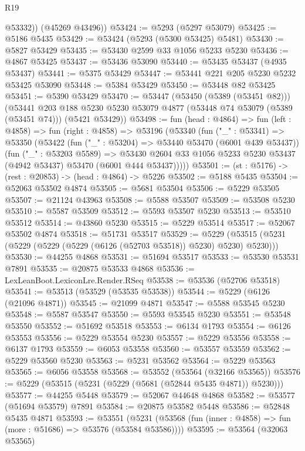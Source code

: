 \begin{lexlean}{R19}
\begin{coremodule}
          @53332))
      (@45269 @43496))
@53424 := @5293 (@5297 @53079)
@53425 := @5186 @5435
@53429 := @53424 (@5293 (@5300 @53425) @5481)
@53430 := @5827 @53429
@53435 := @53430 @2599 @33 @1056 @5233 @5230
@53436 := @4867 @53425
@53437 := @53436 @53090
@53440 := @53435 @53437 (@4935 @53437)
@53441 := @5375 @53429
@53447 := @53441 @221 @205 @5230 @5232 @53425 @53090
@53448 := @5384 @53429
@53450 := @53448 @82 @53425
@53451 := @5390 @53429
@53470 := @53447
    (@53450 (@5389 (@53451 @82)))
    (@53441
      @203
      @188
      @5230
      @5230
      @53079
      @4877
      (@53448 @74 @53079 (@5389 (@53451 @74)))
      (@5421 @53429))
@53498 := fun (head : @4864) =>
  fun (left : @4858) =>
  fun (right : @4858) =>
  @53196
    (@53340
      (fun ("_" : @53341) =>
      @53350
        (@53422
          (fun ("_" : @53204) => @53440 @53470 (@6001 @439 @53437))
          (fun ("_" : @53203 @5589) =>
          @53430 @2604 @33 @1056 @5233 @5230 @53437 (@4942 @53437) @53470 (@6001 @444 @53437)))))
@53501 := (st : @5176) -> (rest : @20853) -> (head : @4864) -> @5226
@53502 := @5188 @5435
@53504 := @52063 @53502 @4874
@53505 := @5681 @53504
@53506 := @5229 @53505
@53507 := @21124 @43963
@53508 := @5588 @53507
@53509 := @53508 @5230
@53510 := @5587 @53509
@53512 := @5593 @53507 @5230
@53513 := @53510 @53512
@53514 := @43860 @5230
@53515 := @5229 @53514
@53517 := @52067 @53502 @4874
@53518 := @51731 @53517
@53529 := @5229 (@53515 (@5231 (@5229 (@5229 (@5229 (@6126 (@52703 @53518)) @5230) @5230) @5230)))
@53530 := @44255 @4868
@53531 := @51694 @53517
@53533 := @53530 @53531 @7891
@53535 := @20875 @53533 @4868
@53536 := LexLeanBoot.LexiconLre.Render.RSeq
@53538 := @53536 (@52706 @53518)
@53541 := @53513 (@53529 (@53535 @53538))
@53544 := @5229 (@6126 (@21096 @4871))
@53545 := @21099 @4871
@53547 := @5588 @53545 @5230
@53548 := @5587 @53547
@53550 := @5593 @53545 @5230
@53551 := @53548 @53550
@53552 := @51692 @53518
@53553 := @6134 @1793
@53554 := @6126 @53553
@53556 := @5229 @53554 @5230
@53557 := @5229 @53556
@53558 := @6137 @1793
@53559 := @6053 @53558
@53560 := @53557 @53559
@53562 := @5229 @53560 @5230
@53563 := @5231 @53562
@53564 := @5229 @53563
@53565 := @6056 @53558
@53568 := @53552 (@53564 (@32166 @53565))
@53576 := @5229 (@53515 (@5231 (@5229 (@5681 (@52844 @5435 @4871)) @5230)))
@53577 := @44255 @5448
@53579 := @52067 @44648 @4868
@53582 := @53577 (@51694 @53579) @7891
@53584 := @20875 @53582 @5448
@53586 := @52848 @5435 @4871
@53593 := @53551
    (@5231 (@53568 (fun (inner : @4858) => fun (more : @51686) => @53576 (@53584 @53586))))
@53595 := @53564 (@32063 @53565)

\end{coremodule}
\end{lexlean}

